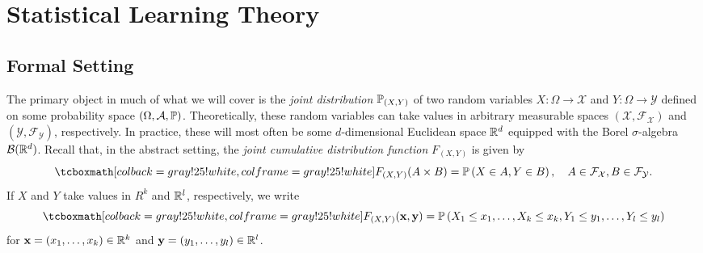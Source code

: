 \part{Statistical Learning Theory}

\chapter{Formal Setting}
\label{ch: formal setting}

The primary object in much of what we will cover is the \emph{joint distribution} $\P_{(X, Y)}$ of two random variables $X \colon \Omega \to \mathcal{X}$ and $Y \colon \Omega \to \mathcal{Y}$ defined on some probability space $(\Omega, \mathcal{A}, \P)$. Theoretically, these random variables can take values in arbitrary measurable spaces $(\mathcal{X}, \mathcal{F}_{\mathcal{X}})$ and $(\mathcal{Y}, \mathcal{F}_{\mathcal{Y}})$, respectively. In practice, these will most often be some $d$-dimensional Euclidean space $\R^d$ equipped with the Borel $\sigma$-algebra $\mathcal{B}(\R^d)$. Recall that, in the abstract setting, the \emph{joint cumulative distribution function} $F_{(X, Y)}$ is given by
\[
    \highlightMath{
        F_{(X, Y)}(A \times B) = \Pr{X \in A, Y \in B}, \quad A \in \mathcal{F}_{\mathcal{X}}, B \in \mathcal{F}_{\mathcal{Y}}.
    }
\]
If $X$ and $Y$ take values in $R^k$ and $\R^l$, respectively, we write
\[
    \highlightMath{
        F_{(X, Y)}(\mathbf{x}, \mathbf{y}) = \Pr{X_1 \leq x_1, \dots, X_k \leq x_k, Y_1 \leq y_1, \dots, Y_l \leq y_l}
    }
\]
for $\mathbf{x} = (x_1, \dots, x_k) \in \R^k$ and $\mathbf{y} = (y_1, \dots, y_l) \in \R^l$.

